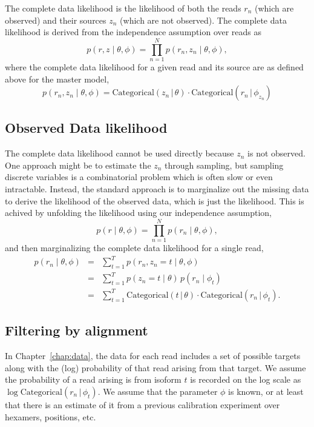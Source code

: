 \documentclass[11pt]{report}
\newcommand{\distro}[3]{\textrm{#1}\!\left( #2 \,|\, #3\right)}
\begin{document}
The complete data likelihood is the likelihood of both the reads $r_n$
(which are observed) and their sources $z_n$ (which are not observed).
The complete data likelihood is derived from the independence
assumption over reads as
\[
  p(r, z \mid \theta, \phi)
  = \prod_{n=1}^N p(r_n, z_n \mid \theta, \phi),
\]
where the complete data likelihood for a given read and its source are
as defined above for the master model,
\[
  p(r_n, z_n \mid \theta, \phi)
  = \distro{Categorical}{z_n}{\theta}
  \cdot \distro{Categorical}{r_n}{\phi_{z_n}}
\]

\subsection{Observed Data likelihood}

The complete data likelihood cannot be used directly because $z_n$ is
not observed.  One approach might be to estimate the $z_n$ through
sampling, but sampling discrete variables is a combinatorial problem
which is often slow or even intractable.  Instead, the standard
approach is to marginalize out the missing data to derive the
likelihood of the observed data, which is just the likelihood.  This
is achived by unfolding the likelihood using our independence
assumption,
\[
  p(r \mid \theta, \phi)
  = \prod_{n=1}^N p(r_n \mid \theta, \phi),
\]
and then marginalizing the complete data likelihood for a single read,
\begin{eqnarray*}
  p(r_n \mid \theta, \phi)
  & = & \textstyle \sum_{t=1}^T p(r_n, z_n = t \mid \theta, \phi)
  \\[4pt]
  & = & \textstyle \sum_{t=1}^T p(z_n = t \mid \theta) \, p(r_n \mid \phi_t)
  \\[4pt]
  & = & \textstyle \sum_{t=1}^T \distro{Categorical}{t}{\theta}
        \cdot \distro{Categorical}{r_n}{\phi_t}.
\end{eqnarray*}

\subsection{Filtering by alignment}

In Chapter~\ref{chap:data}, the data for each read includes a set of
possible targets along with the (log) probability of that read arising
from that target.  We assume the probability of a read arising is from
isoform $t$ is recorded on the log scale as
$\log \distro{Categorical}{r_n}{\phi_t}$.  We assume that the
parameter $\phi$ is known, or at least that there is an estimate of it
from a previous calibration experiment over hexamers, positions, etc.
\end{document}
